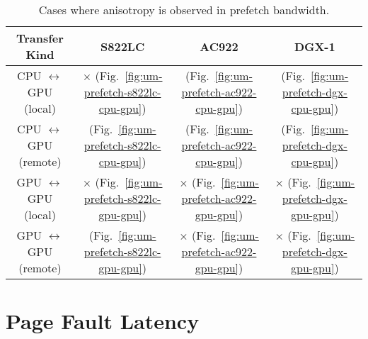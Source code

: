 \begin{table}[ht]
	\centering
	\caption[Anisotropy in prefetch bandwidth]{
		Cases where anisotropy is observed in prefetch bandwidth.
	}
	\label{tab:um-prefetch-anisotropy}
	\begin{tabular}{cccc}
		\hline
		\textbf{Transfer Kind}             & \textbf{S822LC}                                        & \textbf{AC922}                                        & \textbf{DGX-1}                                      \\ \hline 
		CPU $\leftrightarrow$ GPU (local)  & $\times$   (Fig.~\ref{fig:um-prefetch-s822lc-cpu-gpu}) & \checkmark (Fig.~\ref{fig:um-prefetch-ac922-cpu-gpu}) & \checkmark (Fig.~\ref{fig:um-prefetch-dgx-cpu-gpu}) \\ \hline
		CPU $\leftrightarrow$ GPU (remote) & \checkmark (Fig.~\ref{fig:um-prefetch-s822lc-cpu-gpu}) & \checkmark (Fig.~\ref{fig:um-prefetch-ac922-cpu-gpu}) & \checkmark (Fig.~\ref{fig:um-prefetch-dgx-cpu-gpu}) \\ \hline
		GPU $\leftrightarrow$ GPU (local)  & $\times$   (Fig.~\ref{fig:um-prefetch-s822lc-gpu-gpu}) & $\times$   (Fig.~\ref{fig:um-prefetch-ac922-gpu-gpu}) & $\times$ (Fig.~\ref{fig:um-prefetch-dgx-gpu-gpu})   \\ \hline
		GPU $\leftrightarrow$ GPU (remote) & \checkmark (Fig.~\ref{fig:um-prefetch-s822lc-gpu-gpu}) & $\times$   (Fig.~\ref{fig:um-prefetch-ac922-gpu-gpu}) & $\times$ (Fig.~\ref{fig:um-prefetch-dgx-gpu-gpu})   \\ \hline
	\end{tabular}
\end{table}

%
%
%
\section{Page Fault Latency}
\label{sec:um-page-fault}

